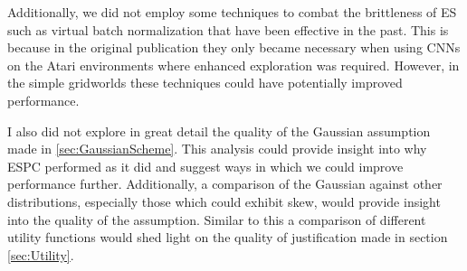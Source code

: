 Additionally, we did not employ some techniques to combat the brittleness of ES such as virtual batch normalization that have been effective in the past. This is because in the original publication they only became necessary when using CNNs on the Atari environments where enhanced exploration was required. However, in the simple gridworlds these techniques could have potentially improved performance.

I also did not explore in great detail the quality of the Gaussian assumption made in \ref{sec:GaussianScheme}. This analysis could provide insight into why ESPC performed as it did and suggest ways in which we could improve performance further. Additionally, a comparison of the Gaussian against other distributions, especially those which could exhibit skew, would provide insight into the quality of the assumption. Similar to this a comparison of different utility functions would shed light on the quality of justification made in section \ref{sec:Utility}.


    





